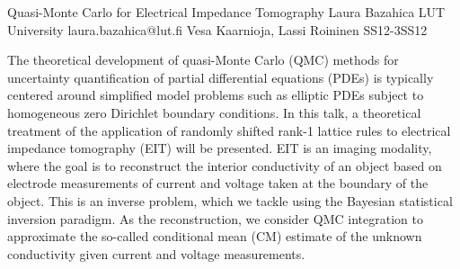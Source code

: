 \begin{talk}
  {Quasi-Monte Carlo for Electrical Impedance Tomography}%
  {Laura Bazahica}%
  {LUT University}%
  {laura.bazahica@lut.fi}%
  {Vesa Kaarnioja, Lassi Roininen}%
{}{}{SS12-3}{SS12}

			
The theoretical development of quasi-Monte Carlo (QMC) methods for uncertainty quantification of partial differential equations (PDEs) is typically centered around simplified model problems such as elliptic PDEs subject to homogeneous zero Dirichlet boundary conditions. In this talk, a theoretical treatment of the application of randomly shifted rank-1 lattice rules to electrical impedance tomography (EIT) will be presented. EIT is an imaging modality, where the goal is to reconstruct the interior conductivity of an object based on electrode measurements of current and voltage taken at the boundary of the object. This is an inverse problem, which we tackle using the Bayesian statistical inversion paradigm. As the reconstruction, we consider QMC integration to approximate the so-called conditional mean (CM) estimate of the unknown conductivity given current and voltage measurements.

\medskip

\end{talk}

